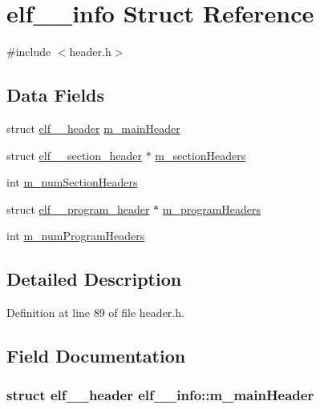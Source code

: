 \hypertarget{structelf__32__info}{
\section{elf\_\_\-info Struct Reference}
\label{structelf__32__info}
}


{\ttfamily \#include $<$header.h$>$}

\subsection*{Data Fields}
\begin{DoxyCompactItemize}
\item 
struct \hyperlink{structelf__32__header}{elf\_\_\-header} \hyperlink{structelf__32__info_afad69f71c04aeaa868d04063781741ea}{m\_\-mainHeader}
\item 
struct \hyperlink{structelf__32__section__header}{elf\_\_\-section\_\-header} $\ast$ \hyperlink{structelf__32__info_ab8d46ddc9a0d9ba619b7ab8d296e8b52}{m\_\-sectionHeaders}
\item 
int \hyperlink{structelf__32__info_a701e263cc9e77c5e031b01faef03ed79}{m\_\-numSectionHeaders}
\item 
struct \hyperlink{structelf__32__program__header}{elf\_\_\-program\_\-header} $\ast$ \hyperlink{structelf__32__info_a26df4e771f5978aa40f2ddef21370e4b}{m\_\-programHeaders}
\item 
int \hyperlink{structelf__32__info_a3d0840d804c71febb4e372812f9f5b3e}{m\_\-numProgramHeaders}
\end{DoxyCompactItemize}


\subsection{Detailed Description}


Definition at line 89 of file header.h.



\subsection{Field Documentation}
\hypertarget{structelf__32__info_afad69f71c04aeaa868d04063781741ea}{
\subsubsection[{m\_\-mainHeader}]{\setlength{\rightskip}{0pt plus 5cm}struct {\bf elf\_\_\-header} {\bf elf\_\_\-info::m\_\-mainHeader}}}
\label{structelf__32__info_afad69f71c04aeaa868d04063781741ea}


